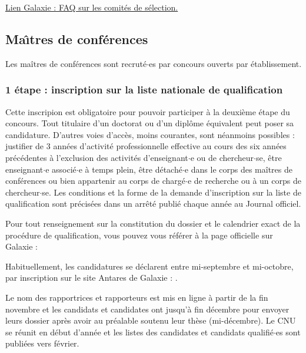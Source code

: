 \href{https://www.galaxie.enseignementsup-recherche.gouv.fr/ensup/etab_FAQ_comites_selection.html}{Lien Galaxie : FAQ sur les comit\'es de s\'election.}


\subsection{Ma\^\i tres de conf\'erences}

Les ma\^itres de conf\'erences sont recrut\'e$\cdot$es par concours ouverts par \'etablissement.

\subsubsection*{1\iere{} \'etape : inscription sur la liste nationale de qualification}

Cette inscripion est obligatoire pour pouvoir participer \`a la
deuxi\`eme \'etape du concours. Tout titulaire d'un doctorat ou d'un
dipl\^ome \'equivalent peut poser sa candidature. D'autres voies
d'acc\`es, moins courantes, sont n\'eanmoins possibles : justifier de
3 ann\'ees d'activit\'e professionnelle effective au cours des six
ann\'ees pr\'ec\'edentes \`a l'exclusion des activit\'es
d'enseignant$\cdot$e ou de chercheur$\cdot$se, \^etre enseignant$\cdot$e associ\'e$\cdot$e \`a temps
plein, \^etre d\'etach\'e$\cdot$e dans le corps des ma\^itres de
conf\'erences ou bien appartenir au corps de charg\'e$\cdot$e de recherche
ou \`a un corps de chercheur$\cdot$se. Les conditions et la forme de la
demande d'inscription sur la liste de qualification sont
pr\'ecis\'ees dans un arr\^et\'e publi\'e chaque ann\'ee au Journal
officiel.

Pour tout renseignement sur la constitution du dossier et le calendrier exact de la proc\'edure de qualification, 
vous pouvez vous r\'ef\'erer \`a la page officielle sur Galaxie :

{}

Habituellement, les candidatures se d\'eclarent entre mi-septembre et mi-octobre, 
par inscription sur le site Antares de Galaxie : .

Le nom des rapportrices et rapporteurs est mis en ligne \`a partir de la fin novembre et 
les candidats et candidates ont jusqu'\`a fin d\'ecembre pour envoyer leurs dossier apr\`es avoir au pr\'ealable soutenu
leur th\`ese (mi-d\'ecembre).
Le CNU se r\'eunit en d\'ebut d'ann\'ee et les listes des candidates et candidats qualifi\'e$\cdot$es sont publi\'ees vers f\'evrier.

